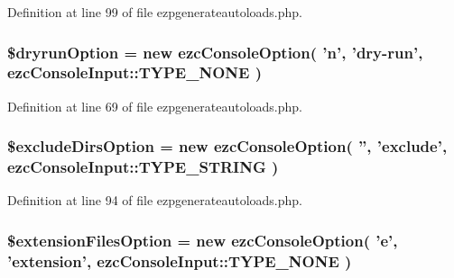 \-Definition at line 99 of file ezpgenerateautoloads.\-php.

\hypertarget{ezpgenerateautoloads_8php_a2157a552be64e9a75918a23fef9e26e7}{
\subsubsection[{\$dryrun\-Option}]{\setlength{\rightskip}{0pt plus 5cm}\$dryrun\-Option = new ezc\-Console\-Option( 'n', 'dry-\/run', ezc\-Console\-Input\-::\-T\-Y\-P\-E\-\_\-\-N\-O\-N\-E )}}\label{ezpgenerateautoloads_8php_a2157a552be64e9a75918a23fef9e26e7}


\-Definition at line 69 of file ezpgenerateautoloads.\-php.

\hypertarget{ezpgenerateautoloads_8php_ad444c7af1932b7a85e8351702c783790}{
\subsubsection[{\$exclude\-Dirs\-Option}]{\setlength{\rightskip}{0pt plus 5cm}\$exclude\-Dirs\-Option = new ezc\-Console\-Option( '', 'exclude', ezc\-Console\-Input\-::\-T\-Y\-P\-E\-\_\-\-S\-T\-R\-I\-N\-G )}}\label{ezpgenerateautoloads_8php_ad444c7af1932b7a85e8351702c783790}


\-Definition at line 94 of file ezpgenerateautoloads.\-php.

\hypertarget{ezpgenerateautoloads_8php_a35b967cec5da82cfa9989e036ad50642}{
\subsubsection[{\$extension\-Files\-Option}]{\setlength{\rightskip}{0pt plus 5cm}\$extension\-Files\-Option = new ezc\-Console\-Option( 'e', 'extension', ezc\-Console\-Input\-::\-T\-Y\-P\-E\-\_\-\-N\-O\-N\-E )}}\label{ezpgenerateautoloads_8php_a35b967cec5da82cfa9989e036ad50642}


